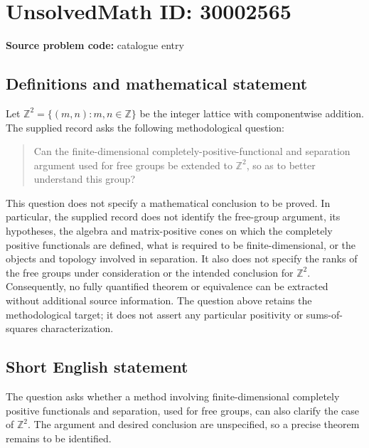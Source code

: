 \documentclass[11pt]{article}
\newcommand{\Z}{\mathbb{Z}}
\begin{document}
\section*{UnsolvedMath ID: 30002565}
\textbf{Source problem code:} catalogue entry
\subsection{Definitions and mathematical statement}
Let \(\Z^2=\{(m,n):m,n\in\Z\}\) be the integer lattice with componentwise addition. The supplied record asks the following methodological question:
\begin{quote}
Can the finite-dimensional completely-positive-functional and separation argument used for free groups be extended to \(\Z^2\), so as to better understand this group?
\end{quote}
This question does not specify a mathematical conclusion to be proved. In particular, the supplied record does not identify the free-group argument, its hypotheses, the algebra and matrix-positive cones on which the completely positive functionals are defined, what is required to be finite-dimensional, or the objects and topology involved in separation. It also does not specify the ranks of the free groups under consideration or the intended conclusion for \(\Z^2\). Consequently, no fully quantified theorem or equivalence can be extracted without additional source information. The question above retains the methodological target; it does not assert any particular positivity or sums-of-squares characterization.
\subsection{Short English statement}
The question asks whether a method involving finite-dimensional completely positive functionals and separation, used for free groups, can also clarify the case of \(\Z^2\). The argument and desired conclusion are unspecified, so a precise theorem remains to be identified.
\end{document}
